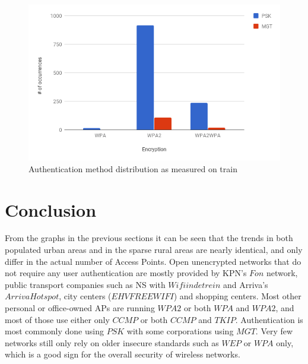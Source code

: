 \documentclass[letterpaper, 10 pt, conference]{ieeeconf}  %
\begin{document}
\begin{figure}[h]
\includegraphics[scale=0.4]{Figures/AuthTrain.png}
\caption{Authentication method distribution as measured on train}
\label{fig:trainauth}
\end{figure}


\section{Conclusion}
From the graphs in the previous sections it can be seen that the trends in both populated urban areas and in the sparse rural areas are nearly identical, and only differ in the actual number of Access Points. Open unencrypted networks that do not require any user authentication are mostly provided by KPN's $Fon$ network, public transport companies such as NS with $Wifi in de trein$ and Arriva's $ArrivaHotspot$, city centers ($EHV FREE WIFI$) and shopping centers. Most other personal or office-owned APs are running $WPA2$ or both $WPA$ and $WPA2$, and most of those use either only $CCMP$ or both $CCMP$ and $TKIP$. Authentication is most commonly done using $PSK$ with some corporations using $MGT$. Very few networks still only rely on older insecure standards such as $WEP$ or $WPA$ only, which is a good sign for the overall security of wireless networks.
\end{document}
